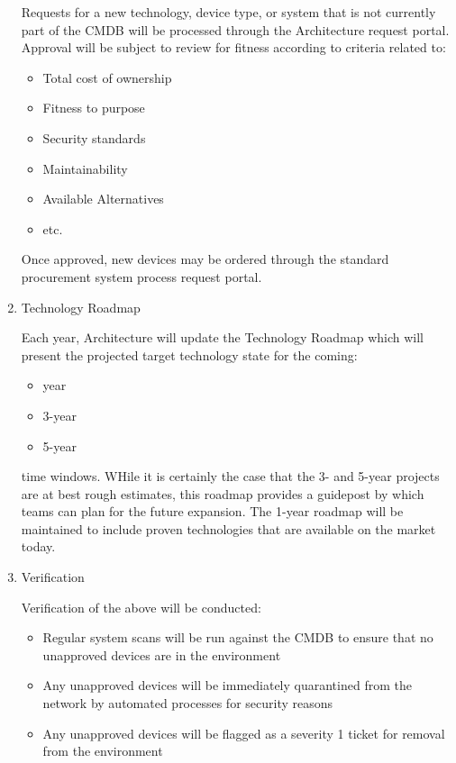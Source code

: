 \documentclass[stu]{apa7}
\begin{document}
\begin{enumerate}
Requests for a new technology, device type, or system that is not currently part of the CMDB will be processed through the Architecture request portal. Approval will be subject to review for fitness according to criteria related to:

\begin{itemize}
\item Total cost of ownership
\item Fitness to purpose
\item Security standards
\item Maintainability
\item Available Alternatives
\item etc.
\end{itemize}

Once approved, new devices may be ordered through the standard procurement system process request portal.

\item Technology Roadmap
\label{sec:org2b7a0fa}

Each year, Architecture will update the Technology Roadmap which will present the projected target technology state for the coming:

\begin{itemize}
\item year
\item 3-year
\item 5-year
\end{itemize}

time windows. WHile it is certainly the case that the 3- and 5-year projects are at best rough estimates, this roadmap provides a guidepost by which teams can plan for the future expansion. The 1-year roadmap will be maintained to include proven technologies that are available on the market today.

\item Verification
\label{sec:org237b151}

Verification of the above will be conducted:

\begin{itemize}
\item Regular system scans will be run against the CMDB to ensure that no unapproved devices are in the environment
\item Any unapproved devices will be immediately quarantined from the network by automated processes for security reasons
\item Any unapproved devices will be flagged as a severity 1 ticket for removal from the environment
\end{itemize}
\end{enumerate}
\end{document}
